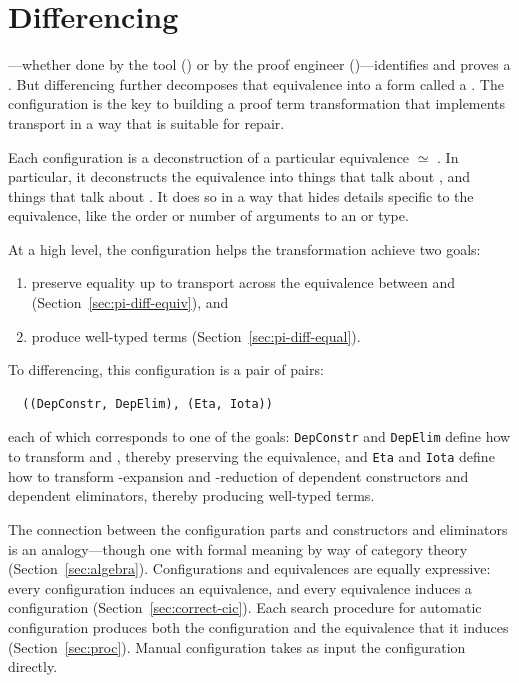\section{Differencing}
\label{sec:pi-diff}

---whether done by the tool () or by the proof engineer ()---identifies 
and proves a . But differencing further decomposes that equivalence into a form called a . 
The configuration is the key to building a proof term transformation that implements transport in a way that is suitable for repair.

Each configuration is a deconstruction of a particular equivalence \Aa $\simeq$ \B.
In particular, it deconstructs the equivalence into things that talk about \Aa, and things that talk about \B.
It does so in a way that hides details
specific to the equivalence, like the order or number of arguments to an  or type.

At a high level, the configuration helps the transformation achieve two goals: 

\begin{enumerate}
\item preserve equality up to transport across the equivalence between \Aa and \B (Section~\ref{sec:pi-diff-equiv}), and 
\item produce well-typed terms (Section~\ref{sec:pi-diff-equal}).
\end{enumerate}
To differencing, this configuration is a pair of pairs:

\begin{lstlisting}
  ((DepConstr, DepElim), (Eta, Iota))
\end{lstlisting}
each of which corresponds to one of the goals:
\lstinline{DepConstr} and \lstinline{DepElim} define how to transform  and , thereby preserving the equivalence, and 
\lstinline{Eta} and \lstinline{Iota} define how to transform \intro{$\eta$}-expansion and \intro{$\iota$}-reduction of dependent constructors and dependent eliminators, thereby producing well-typed terms.

The connection between the configuration parts and constructors and eliminators is an analogy---though one with formal meaning by way of
category theory (Section~\ref{sec:algebra}).
Configurations and equivalences are equally expressive: every configuration induces an equivalence, and every equivalence induces a configuration
(Section~\ref{sec:correct-cic}).
Each search procedure for automatic configuration produces both the configuration and the equivalence that it induces (Section~\ref{sec:proc}).
Manual configuration takes as input the configuration directly.

